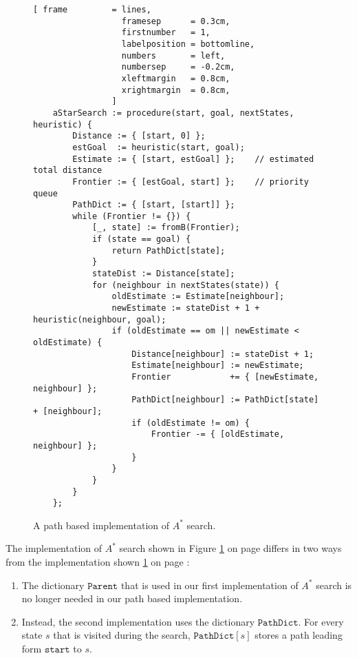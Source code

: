 \begin{figure}[!ht]
\centering
\begin{Verbatim}[ frame         = lines, 
                  framesep      = 0.3cm, 
                  firstnumber   = 1,
                  labelposition = bottomline,
                  numbers       = left,
                  numbersep     = -0.2cm,
                  xleftmargin   = 0.8cm,
                  xrightmargin  = 0.8cm,
                ]
    aStarSearch := procedure(start, goal, nextStates, heuristic) {
        Distance := { [start, 0] };
        estGoal  := heuristic(start, goal);
        Estimate := { [start, estGoal] };    // estimated total distance
        Frontier := { [estGoal, start] };    // priority queue
        PathDict := { [start, [start]] };
        while (Frontier != {}) {
            [_, state] := fromB(Frontier);
            if (state == goal) {
                return PathDict[state];
            }
            stateDist := Distance[state];
            for (neighbour in nextStates(state)) {
                oldEstimate := Estimate[neighbour];
                newEstimate := stateDist + 1 + heuristic(neighbour, goal);
                if (oldEstimate == om || newEstimate < oldEstimate) {
                    Distance[neighbour] := stateDist + 1;
                    Estimate[neighbour] := newEstimate;
                    Frontier            += { [newEstimate, neighbour] };
                    PathDict[neighbour] := PathDict[state] + [neighbour];
                    if (oldEstimate != om) {
                        Frontier -= { [oldEstimate, neighbour] };
                    }
                }
            }
        }
    };
\end{Verbatim}
\vspace*{-0.3cm}
\caption{A path based implementation of $A^*$ search.}
\label{fig:a-star-search-path.stlx}
\end{figure}

The implementation of $A^*$ search shown in Figure \ref{fig:a-star-search-path.stlx} on page
\pageref{fig:a-star-search-path.stlx} differs in two ways from the implementation shown
\ref{fig:a-star-search-path.stlx} on page \pageref{fig:a-star-search-path.stlx}:
\begin{enumerate}
\item The dictionary $\texttt{Parent}$ that is used in our first implementation of $A^*$ search 
      is no longer needed in our path based implementation.
\item Instead, the second implementation uses the dictionary $\texttt{PathDict}$.  For every state $s$ that is
      visited during the search, $\texttt{PathDict}[s]$ stores a path leading form $\texttt{start}$ to $s$.
\end{enumerate}

